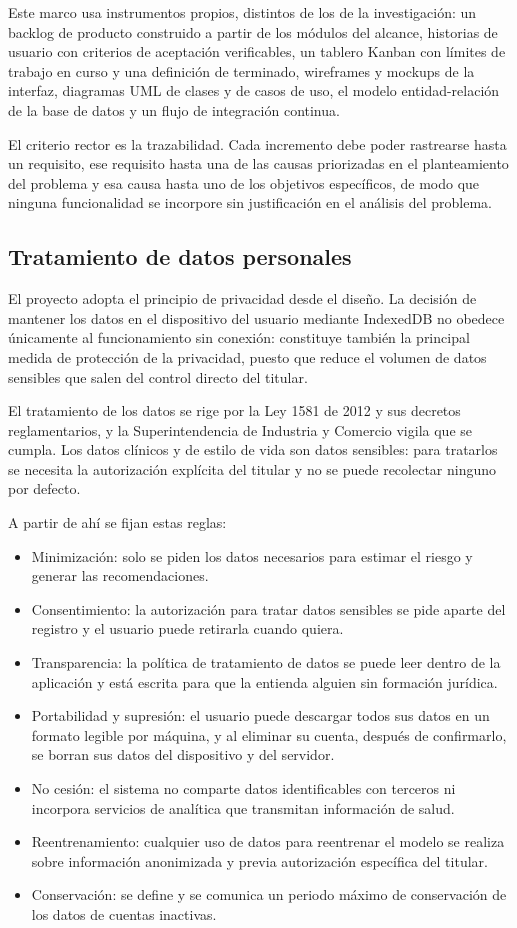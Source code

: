 \documentclass[conference]{IEEEtran}
\begin{document}
Este marco usa instrumentos propios, distintos de los de la investigación: un backlog de producto construido a partir de los módulos del alcance, historias de usuario con criterios de aceptación verificables, un tablero Kanban con límites de trabajo en curso y una definición de terminado, wireframes y mockups de la interfaz, diagramas UML de clases y de casos de uso, el modelo entidad-relación de la base de datos y un flujo de integración continua.

El criterio rector es la trazabilidad. Cada incremento debe poder rastrearse hasta un requisito, ese requisito hasta una de las causas priorizadas en el planteamiento del problema y esa causa hasta uno de los objetivos específicos, de modo que ninguna funcionalidad se incorpore sin justificación en el análisis del problema.

\subsection{Tratamiento de datos personales}
El proyecto adopta el principio de privacidad desde el diseño. La decisión de mantener los datos en el dispositivo del usuario mediante IndexedDB no obedece únicamente al funcionamiento sin conexión: constituye también la principal medida de protección de la privacidad, puesto que reduce el volumen de datos sensibles que salen del control directo del titular.

El tratamiento de los datos se rige por la Ley 1581 de 2012 y sus decretos reglamentarios, y la Superintendencia de Industria y Comercio vigila que se cumpla. Los datos clínicos y de estilo de vida son datos sensibles: para tratarlos se necesita la autorización explícita del titular y no se puede recolectar ninguno por defecto.

A partir de ahí se fijan estas reglas:

\begin{itemize}
\item Minimización: solo se piden los datos necesarios para estimar el riesgo y generar las recomendaciones.
\item Consentimiento: la autorización para tratar datos sensibles se pide aparte del registro y el usuario puede retirarla cuando quiera.
\item Transparencia: la política de tratamiento de datos se puede leer dentro de la aplicación y está escrita para que la entienda alguien sin formación jurídica.
\item Portabilidad y supresión: el usuario puede descargar todos sus datos en un formato legible por máquina, y al eliminar su cuenta, después de confirmarlo, se borran sus datos del dispositivo y del servidor.
\item No cesión: el sistema no comparte datos identificables con terceros ni incorpora servicios de analítica que transmitan información de salud.
\item Reentrenamiento: cualquier uso de datos para reentrenar el modelo se realiza sobre información anonimizada y previa autorización específica del titular.
\item Conservación: se define y se comunica un periodo máximo de conservación de los datos de cuentas inactivas.
\end{itemize}
\end{document}
